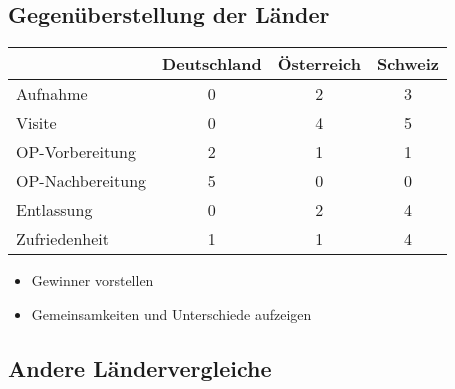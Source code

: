 \subsection{Gegenüberstellung der Länder}
\begin{tabular}{l|c|c|c}
&Deutschland&Österreich&Schweiz\\
\hline
Aufnahme&0&2&3\\
Visite&0&4&5\\
OP-Vorbereitung&2&1&1\\
OP-Nachbereitung&5&0&0\\
Entlassung&0&2&4\\
Zufriedenheit&1&1&4\\
\end{tabular}
\begin{itemize}
	\item Gewinner vorstellen
	\item Gemeinsamkeiten und Unterschiede aufzeigen
\end{itemize}
\subsection{Andere Ländervergleiche}
